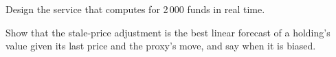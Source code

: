 \begin{interviewq}\label{iq:hf:etf-market-making:5}
Design the service that computes  for 2\,000 funds in real time.
\end{interviewq}

\begin{interviewq}\label{iq:hf:etf-market-making:6}
Show that the stale-price adjustment is the best linear forecast of a holding's value given its last price and the proxy's move, and say when it is
biased.
\end{interviewq}
